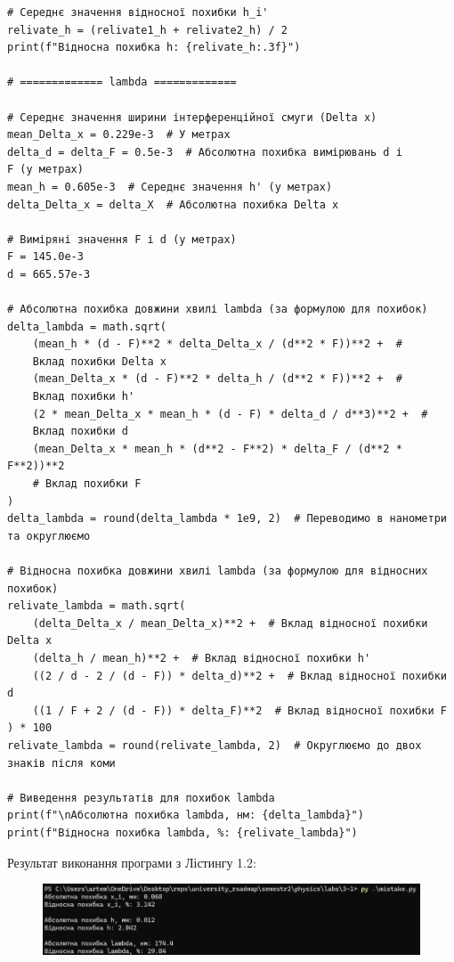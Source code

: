 \documentclass[12pt,a4paper]{article}
\begin{document}
{\begin{verbatim}
# Середнє значення відносної похибки h_i'
relivate_h = (relivate1_h + relivate2_h) / 2
print(f"Відносна похибка h: {relivate_h:.3f}")

# ============= lambda =============

# Середнє значення ширини інтерференційної смуги (Delta x)
mean_Delta_x = 0.229e-3  # У метрах
delta_d = delta_F = 0.5e-3  # Абсолютна похибка вимірювань d і
F (у метрах)
mean_h = 0.605e-3  # Середнє значення h' (у метрах)
delta_Delta_x = delta_X  # Абсолютна похибка Delta x

# Виміряні значення F і d (у метрах)
F = 145.0e-3
d = 665.57e-3

# Абсолютна похибка довжини хвилі lambda (за формулою для похибок)
delta_lambda = math.sqrt(
    (mean_h * (d - F)**2 * delta_Delta_x / (d**2 * F))**2 +  #
    Вклад похибки Delta x
    (mean_Delta_x * (d - F)**2 * delta_h / (d**2 * F))**2 +  #
    Вклад похибки h'
    (2 * mean_Delta_x * mean_h * (d - F) * delta_d / d**3)**2 +  #
    Вклад похибки d
    (mean_Delta_x * mean_h * (d**2 - F**2) * delta_F / (d**2 * F**2))**2 
    # Вклад похибки F
)
delta_lambda = round(delta_lambda * 1e9, 2)  # Переводимо в нанометри
та округлюємо

# Відносна похибка довжини хвилі lambda (за формулою для відносних похибок)
relivate_lambda = math.sqrt(
    (delta_Delta_x / mean_Delta_x)**2 +  # Вклад відносної похибки Delta x
    (delta_h / mean_h)**2 +  # Вклад відносної похибки h'
    ((2 / d - 2 / (d - F)) * delta_d)**2 +  # Вклад відносної похибки d
    ((1 / F + 2 / (d - F)) * delta_F)**2  # Вклад відносної похибки F
) * 100
relivate_lambda = round(relivate_lambda, 2)  # Округлюємо до двох
знаків після коми

# Виведення результатів для похибок lambda
print(f"\nАбсолютна похибка lambda, нм: {delta_lambda}")
print(f"Відносна похибка lambda, %: {relivate_lambda}")
\end{verbatim}
}

Результат виконання програми з Лістингу 1.2:
\begin{figure}[ht]
    \includegraphics[width=1.0\textwidth]{listing2.png}
\end{figure}
\end{document}
